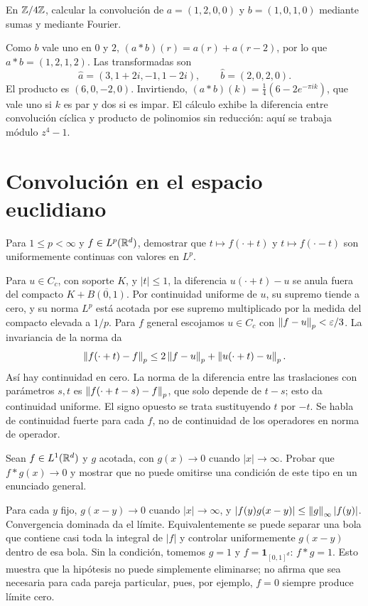 \begin{ejercicio}\label{ej:v4-ampl-dft4}
En $\mathbb Z/4\mathbb Z$, calcular la convolución de $a=(1,2,0,0)$ y $b=(1,0,1,0)$ mediante sumas y mediante Fourier.
\end{ejercicio}
\begin{solucion}
Como $b$ vale uno en $0$ y $2$, $(a*b)(r)=a(r)+a(r-2)$, por lo que $a*b=(1,2,1,2)$. Las transformadas son
\[
 \widehat a=(3,1+2i,-1,1-2i),\qquad \widehat b=(2,0,2,0).
\]
El producto es $(6,0,-2,0)$. Invirtiendo, $(a*b)(k)=\tfrac14(6-2e^{-\pi ik})$, que vale uno si $k$ es par y dos si es impar. El cálculo exhibe la diferencia entre convolución cíclica y producto de polinomios sin reducción: aquí se trabaja módulo $z^4-1$.
\end{solucion}

\chapter{Convolución en el espacio euclidiano}

\begin{ejercicio}\label{ej:v4-l09-1}
Para $1\leq p<\infty$ y $f\in L^p(\mathbb R^d)$, demostrar que $t\mapsto f(\cdot+t)$ y $t\mapsto f(\cdot-t)$ son uniformemente continuas con valores en $L^p$.
\end{ejercicio}
\begin{solucion}
Para $u\in C_c$, con soporte $K$, y $|t|\leq1$, la diferencia $u(\cdot+t)-u$ se anula fuera del compacto $K+\overline{B(0,1)}$. Por continuidad uniforme de $u$, su supremo tiende a cero, y su norma $L^p$ está acotada por ese supremo multiplicado por la medida del compacto elevada a $1/p$. Para $f$ general escojamos $u\in C_c$ con $\left\lVert f-u\right\rVert_p<\varepsilon/3$. La invariancia de la norma da
\[
 \left\lVert f(\cdot+t)-f\right\rVert_p\leq2\left\lVert f-u\right\rVert_p+\left\lVert u(\cdot+t)-u\right\rVert_p.
\]
Así hay continuidad en cero. La norma de la diferencia entre las traslaciones con parámetros $s,t$ es $\left\lVert f(\cdot+t-s)-f\right\rVert_p$, que solo depende de $t-s$; esto da continuidad uniforme. El signo opuesto se trata sustituyendo $t$ por $-t$. Se habla de continuidad fuerte para cada $f$, no de continuidad de los operadores en norma de operador.
\end{solucion}

\begin{ejercicio}\label{ej:v4-l09-2}
Sean $f\in L^1(\mathbb R^d)$ y $g$ acotada, con $g(x)\to0$ cuando $|x|\to\infty$. Probar que $f*g(x)\to0$ y mostrar que no puede omitirse una condición de este tipo en un enunciado general.
\end{ejercicio}
\begin{solucion}
Para cada $y$ fijo, $g(x-y)\to0$ cuando $|x|\to\infty$, y $|f(y)g(x-y)|\leq\left\lVert g\right\rVert_\infty|f(y)|$. Convergencia dominada da el límite. Equivalentemente se puede separar una bola que contiene casi toda la integral de $|f|$ y controlar uniformemente $g(x-y)$ dentro de esa bola. Sin la condición, tomemos $g=1$ y $f=\mathbf1_{[0,1]^d}$: $f*g=1$. Esto muestra que la hipótesis no puede simplemente eliminarse; no afirma que sea necesaria para cada pareja particular, pues, por ejemplo, $f=0$ siempre produce límite cero.
\end{solucion}

